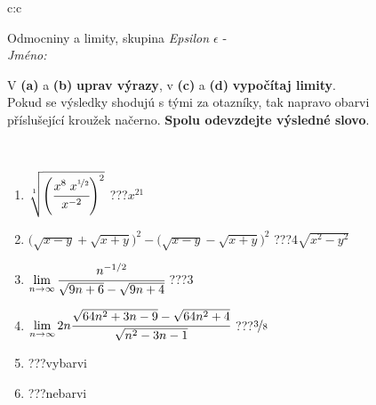 \documentclass[10pt]{report}
\begin{document}
\newpage
\thispagestyle{empty}
\begin{tabular}{c:c}
\begin{minipage}[c][104.5mm][t]{0.5\linewidth}
\begin{center}
\vspace{7mm}
{\huge Odmocniny a limity, skupina \textit{Epsilon $\epsilon$} -}\\[5mm]
\textit{Jméno:}\phantom{xxxxxxxxxxxxxxxxxxxxxxxxxxxxxxxxxxxxxxxxxxxxxxxxxxxxxxxxxxxxxxxxx}\\[5mm]
\begin{minipage}{0.95\linewidth}
\begin{center}
V \textbf{(a)} a \textbf{(b)} \textbf{uprav výrazy}, v \textbf{(c)} a \textbf{(d)} \textbf{vypočítaj limity}.\\Pokud se výsledky shodujú s tými za otazníky, tak napravo obarvi\\příslušející kroužek načerno. \textbf{Spolu odevzdejte výsledné slovo}.
\end{center}
\end{minipage}
\\[1mm]
\begin{minipage}{0.79\linewidth}
\begin{center}
\begin{varwidth}{\linewidth}
\begin{enumerate}
\small
\item $\sqrt[1]{\left(\cfrac{x^{8}\;x^{\nicefrac{1}{2}}}{x^{-2}}\right)^{2}}$\quad \dotfill\; ???\;\dotfill \quad $x^{21}$
\item {\footnotesize{\scriptsize$\big(\sqrt{x-y}+\sqrt{x+y}\big)^2-\big(\sqrt{x-y}-\sqrt{x+y}\big)^2$}\quad \dotfill\; ???\;\dotfill \quad $4\sqrt{x^2-y^2}$}
\item $\lim\limits_{n\to\infty}\cfrac{n^{-1/2}}{\sqrt{9n+6}-\sqrt{9n+4}}$\quad \dotfill\; ???\;\dotfill \quad $3$
\item $\lim\limits_{n\to\infty}2n\cfrac{\sqrt{64n^2+3n-9}-\sqrt{64n^2+4}}{\sqrt{n^2-3n-1}}$\quad \dotfill\; ???\;\dotfill \quad $\nicefrac{3}{8}$
\item \quad \dotfill\; ???\;\dotfill \quad vybarvi
\item \quad \dotfill\; ???\;\dotfill \quad nebarvi
\end{enumerate}
\end{varwidth}
\end{center}
\end{minipage}
\begin{minipage}{0.20\linewidth}

\end{minipage}
\end{center}
\end{minipage}
\end{tabular}
\end{document}
